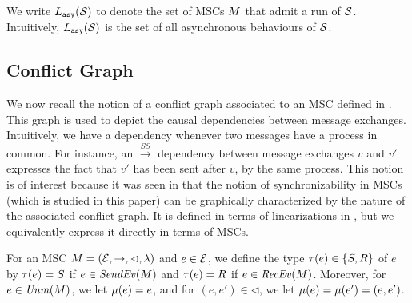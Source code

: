 We write $L_{\mathtt{asy}}(\mathcal{S})$ to denote the set of MSCs $M$ that admit a run of $\mathcal{S}$.
Intuitively, $L_{\mathtt{asy}}(\mathcal{S})$ is the set of all asynchronous behaviours of $\mathcal{S}$.

%

\subsection{Conflict Graph}\label{app:conflict-graph}


We now recall the notion of a conflict graph associated to an MSC defined in \cite{DBLP:conf/cav/BouajjaniEJQ18}. This graph is used to depict the causal dependencies between message exchanges.  Intuitively, we have a dependency whenever
two messages have a process in common. For instance, an $\xrightarrow{SS}$
dependency between message exchanges $v$ and $v'$ expresses the fact that
$v'$ has been sent after $v$, by the same process. This notion is of interest because it was seen in \cite{DBLP:conf/cav/BouajjaniEJQ18} that the notion of synchronizability in MSCs (which is studied in this paper) can be graphically characterized by the nature of the associated conflict graph.
It is defined in terms of linearizations
in \cite{DBLP:conf/fossacs/GiustoLL20}, but we equivalently express it
directly in terms of MSCs.

For an MSC $M = (\mathcal{E}, \rightarrow, \lhd, \lambda)$ and
$e \in \mathcal{E}$, we define the type $\tau(e) \in \{S,R\}$ of $e$ by $\tau(e) = S$ if $e \in \mathit{SendEv}(M)$
and $\tau(e) = R$ if $e \in \mathit{RecEv}(M)$.
Moreover, for $e \in \mathit{Unm}(M)$, we let $\mu(e) = e$,
and for $(e,e') \in \lhd$, we let $\mu(e) = \mu(e') = (e,e')$.


